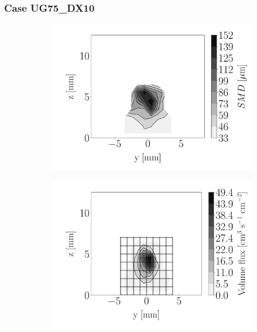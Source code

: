 \subsubsection*{Case UG75\_DX10}





\begin{figure}[h!]
\centering
\begin{subfigure}[b]{0.3\textwidth}
	\centering
   \includegraphics[scale=\scaleSLIJICF]{./part2_developments/figures_ch5_resolved_JICF/injectors_SLI/uG75_dx10_x05_SMD_map}
\end{subfigure}
   \hspace{0.17in}
\begin{subfigure}[b]{0.3\textwidth}
	\centering
   \includegraphics[scale=\scaleSLIJICF]{./part2_developments/figures_ch5_resolved_JICF/injectors_SLI/uG75_dx10_x05_volume_flux_map}

\end{subfigure}
\end{figure}
